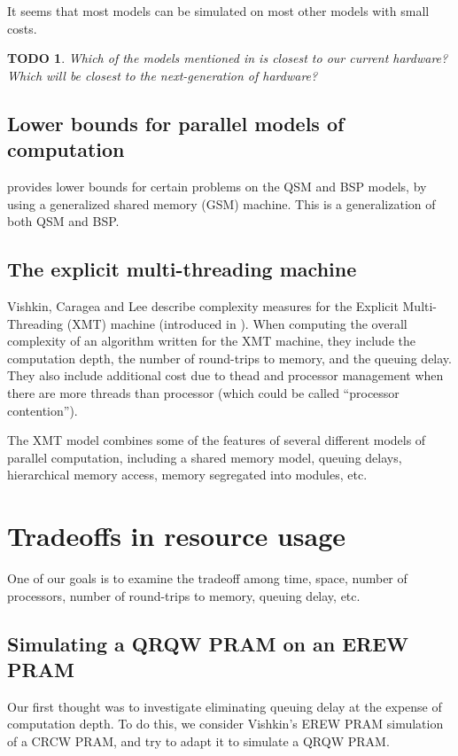 \documentclass{article}
\newtheorem{todo}{TODO}
\begin{document}
It seems that most models can be simulated on most other models with small costs.

\begin{todo}
  Which of the models mentioned in \cite{zcsm07} is closest to our current hardware?
  Which will be closest to the next-generation of hardware?
\end{todo}

\subsection{Lower bounds for parallel models of computation}

\cite{mr98} provides lower bounds for certain problems on the QSM and BSP models, by using a generalized shared memory (GSM) machine.
This is a generalization of both QSM and BSP.

\subsection{The explicit multi-threading machine}
Vishkin, Caragea and Lee \cite{vcl06} describe complexity measures for the Explicit Multi-Threading (XMT) machine (introduced in \cite{vdbn98}).
When computing the overall complexity of an algorithm written for the XMT machine, they include the computation depth, the number of round-trips to memory, and the queuing delay.
They also include additional cost due to thead and processor management when there are more threads than processor (which could be called ``processor contention'').

The XMT model combines some of the features of several different models of parallel computation, including a shared memory model, queuing delays, hierarchical memory access, memory segregated into modules, etc.

\section{Tradeoffs in resource usage}

One of our goals is to examine the tradeoff among time, space, number of processors, number of round-trips to memory, queuing delay, etc.

\subsection{Simulating a QRQW PRAM on an EREW PRAM}

Our first thought was to investigate eliminating queuing delay at the expense of computation depth.
To do this, we consider Vishkin's EREW PRAM simulation of a CRCW PRAM, and try to adapt it to simulate a QRQW PRAM.
\end{document}
